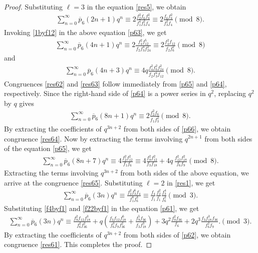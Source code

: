\documentclass[11pt, reqno]{amsart}
\numberwithin{equation}{section}
\begin{document}
	\begin{proof}
		Substituting $\ell=3$ in the equation \eqref{res5}, we obtain
		\begin{align}\label{p63}
			\sum_{n=0}^{\infty}\overline{p}_{6}(2n+1)q^n\equiv2\frac{f_2^2f_6f_8^2}{f_1^4f_3^2f_4}\equiv2\frac{f_6f_8^2}{f_3^2f_4}\pmod{8}.
		\end{align}
		Invoking \eqref{1byf12} in the above equation \eqref{p63}, we get
		\begin{align}
			\sum_{n=0}^{\infty}\overline{p}_{6}(4n+1)q^n\equiv2
			\frac{f_4^2f_{12}^5}
			{f_2f_3^4f_{24}^2}\equiv2\frac{f_4^2f_{12}}{f_2f_6^2}\pmod{8}\label{p64}
		\end{align}
		and
		\begin{align}
			\sum_{n=0}^{\infty}\overline{p}_{6}(4n+3)q^n\equiv4q\frac{f_4^2f_{6}^2f_{24}^2}
			{f_2f_3^4f_{12}}\pmod{8}.\label{p65}
		\end{align}
		Congruences \eqref{res62} and \eqref{res63} follow immediately from \eqref{p65} and \eqref{p64}, respectively. Since the right-hand side of \eqref{p64} is a power series in $q^2$, replacing $q^2$ by $q$ gives
		\begin{align}
			\sum_{n=0}^{\infty}\overline{p}_{6}(8n+1)q^n\equiv2\frac{f_2^2f_6}{f_1f_3^2}\pmod{8}.\label{p66}
		\end{align}
		By extracting the coefficients of $q^{3n+2}$ from both sides of \eqref{p66}, we obtain congruence \eqref{res64}. Now by extracting the terms involving $q^{2n+1}$ from both sides of the equation \eqref{p65}, we get
		\begin{align}
			\sum_{n=0}^{\infty}\overline{p}_{6}(8n+7)q^n\equiv4\frac{f_2^2f_{12}^2}
			{f_1f_{6}}\equiv4\frac{f_9^2f_{12}^2}{f_3f_{18}}
			+4q\,\frac{f_{12}^2f_{18}^2}{f_6f_9}
			\pmod{8}.\label{p67}
		\end{align}
		Extracting the terms involving $q^{3n+2}$ from both sides of the above equation, we arrive at the congruence \eqref{res65}.
		Substituting $\ell=2$ in \eqref{res1}, we get
		\begin{align}\label{p61}
			\sum_{n=0}^{\infty}\overline{p}_{6}(3n)q^n\equiv\frac{f_2^2f_3^6f_4}{f_1^8f_6^3}\equiv\frac{f_4}{f_1}\frac{f_2^2}{f_1}\frac{f_3^4}{f_6^3}\pmod{3}.
		\end{align}
		Substituting \eqref{f4byf1} and \eqref{f22byf1} in the equation \eqref{p61}, we get
		\begin{align}\label{p62}
			\sum_{n=0}^{\infty}\overline{p}_{6}(3n)q^n\equiv
			\frac{f_9^2f_{12}f_{18}^3}{f_6^2f_{36}^2}+q\left(
			\frac{f_3f_{12}f_{18}^6}{f_6^3f_9f_{36}^2}+\frac{f_9^5f_{36}}{f_3f_{18}^3}\right)+3q^2\frac{f_9^2f_{36}}{f_6}+2q^3\frac{f_3f_{18}^3f_{36}}{f_6^2f_9}.
			\pmod{3}.
		\end{align}
		By extracting the coefficients of $q^{3n+2}$ from both sides of \eqref{p62}, we obtain congruence \eqref{res61}. This completes the proof.
	\end{proof}
\end{document}
